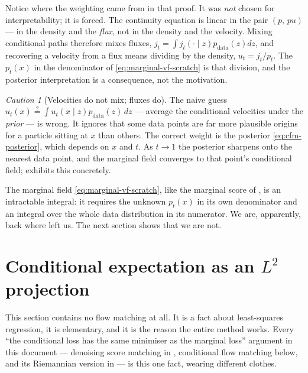 \documentclass[11pt,a4paper]{report}
\theoremstyle{definition}
\theoremstyle{remark}
\newtheorem{caution}[caution]{Caution}
\begin{document}
Notice where the weighting came from in that proof. It was \emph{not}
chosen for interpretability; it is forced. The continuity equation is
linear in the pair $(p,\,pu)$ --- in the density and the \emph{flux}, not
in the density and the velocity. Mixing conditional paths therefore mixes
fluxes, $j_t = \int j_t(\cdot\mid z)p_{\mathrm{data}}(z)dz$, and recovering
a velocity from a flux means dividing by the density, $u_t = j_t/p_t$. The
$p_t(x)$ in the denominator of \eqref{eq:marginal-vf-scratch} is that
division, and the posterior interpretation is a consequence, not the
motivation.

\begin{caution}[Velocities do not mix; fluxes do]
\label{caution:flux-not-velocity}
The naive guess
$u_t(x)\overset{?}{=}\int u_t(x\mid z)p_{\mathrm{data}}(z)\,dz$ --- average
the conditional velocities under the \emph{prior} --- is wrong. It ignores
that some data points are far more plausible origins for a particle sitting
at $x$ than others. The correct weight is the posterior
\eqref{eq:cfm-posterior}, which depends on $x$ and $t$. As $t\to1$ the
posterior sharpens onto the nearest data point, and the marginal field
converges to that point's conditional field;
 exhibits this concretely.
\end{caution}

The marginal field \eqref{eq:marginal-vf-scratch}, like the marginal score
of , is an intractable integral: it requires
the unknown $p_t(x)$ in its own denominator and an integral over the whole
data distribution in its numerator. We are, apparently, back where
 left us. The next section shows that we are
not.

\section{Conditional expectation as an $L^2$ projection}
\label{sec:l2-projection}

This section contains no flow matching at all. It is a fact about
least-squares regression, it is elementary, and it is the reason the entire
method works. Every ``the conditional loss has the same minimiser as the
marginal loss'' argument in this document --- denoising score matching in
, conditional flow matching below, and its
Riemannian version in  --- is this one fact, wearing
different clothes.
\end{document}
